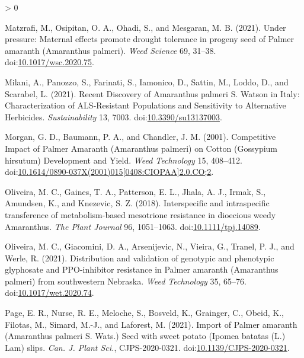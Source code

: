 \documentclass[utf8]{frontiersSCNS}
\newlength{\cslhangindent}
\newenvironment{CSLReferences}[2] %
 {%
  \setlength{\parindent}{0pt}
  \ifodd #1 \everypar{\setlength{\hangindent}{\cslhangindent}}\ignorespaces\fi
  \ifnum #2 > 0
  \setlength{\parskip}{#2\baselineskip}
  \fi
 }%
 {}
\begin{document}
\begin{CSLReferences}{1}{0}
\leavevmode\hypertarget{ref-matzrafi2021}{}%
Matzrafi, M., Osipitan, O. A., Ohadi, S., and Mesgaran, M. B. (2021).
Under pressure: Maternal effects promote drought tolerance in progeny
seed of {Palmer} amaranth ({Amaranthus} palmeri). \emph{Weed Science}
69, 31--38.
doi:\href{https://doi.org/10.1017/wsc.2020.75}{10.1017/wsc.2020.75}.

\leavevmode\hypertarget{ref-milani2021}{}%
Milani, A., Panozzo, S., Farinati, S., Iamonico, D., Sattin, M., Loddo,
D., and Scarabel, L. (2021). Recent {Discovery} of {Amaranthus} palmeri
{S}. {Watson} in {Italy}: {Characterization} of {ALS}-{Resistant
Populations} and {Sensitivity} to {Alternative Herbicides}.
\emph{Sustainability} 13, 7003.
doi:\href{https://doi.org/10.3390/su13137003}{10.3390/su13137003}.

\leavevmode\hypertarget{ref-morgan2001}{}%
Morgan, G. D., Baumann, P. A., and Chandler, J. M. (2001). Competitive
{Impact} of {Palmer Amaranth} ({Amaranthus} palmeri) on {Cotton}
({Gossypium} hirsutum) {Development} and {Yield}. \emph{Weed Technology}
15, 408--412.
doi:\href{https://doi.org/10.1614/0890-037X(2001)015\%5B0408:CIOPAA\%5D2.0.CO;2}{10.1614/0890-037X(2001)015{[}0408:CIOPAA{]}2.0.CO;2}.

\leavevmode\hypertarget{ref-oliveira2018}{}%
Oliveira, M. C., Gaines, T. A., Patterson, E. L., Jhala, A. J., Irmak,
S., Amundsen, K., and Knezevic, S. Z. (2018). Interspecific and
intraspecific transference of metabolism-based mesotrione resistance in
dioecious weedy {Amaranthus}. \emph{The Plant Journal} 96, 1051--1063.
doi:\href{https://doi.org/10.1111/tpj.14089}{10.1111/tpj.14089}.

\leavevmode\hypertarget{ref-oliveira2021a}{}%
Oliveira, M. C., Giacomini, D. A., Arsenijevic, N., Vieira, G., Tranel,
P. J., and Werle, R. (2021). Distribution and validation of genotypic
and phenotypic glyphosate and {PPO}-inhibitor resistance in {Palmer}
amaranth ({Amaranthus} palmeri) from southwestern {Nebraska}. \emph{Weed
Technology} 35, 65--76.
doi:\href{https://doi.org/10.1017/wet.2020.74}{10.1017/wet.2020.74}.

\leavevmode\hypertarget{ref-page2021}{}%
Page, E. R., Nurse, R. E., Meloche, S., Bosveld, K., Grainger, C.,
Obeid, K., Filotas, M., Simard, M.-J., and Laforest, M. (2021). Import
of {Palmer} amaranth ({Amaranthus} palmeri {S}. {Wats}.) Seed with sweet
potato ({Ipomea} batatas ({L}.) {Lam}) slips. \emph{Can. J. Plant Sci.},
CJPS-2020-0321.
doi:\href{https://doi.org/10.1139/CJPS-2020-0321}{10.1139/CJPS-2020-0321}.


\end{CSLReferences}
\end{document}
